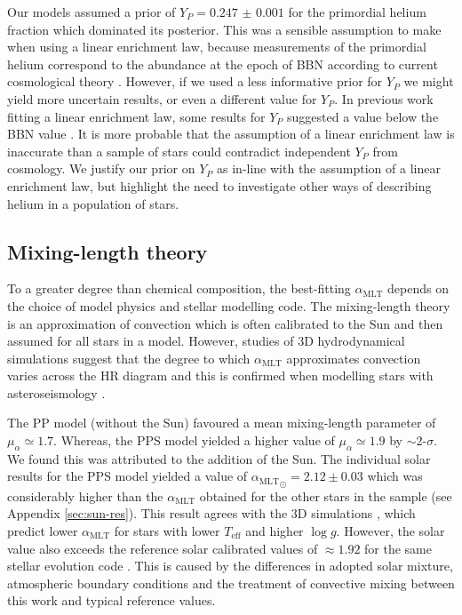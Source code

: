 \documentclass[a4paper,fleqn,usenatbib]{mnras}
\newcommand{\teff}{\ensuremath{T_\mathrm{eff}}}
\newcommand{\mlt}{\ensuremath{{\alpha_\mathrm{MLT}}}}
\begin{document}
Our models assumed a prior of $Y_P = \num{0.247(1)}$ for the primordial helium fraction which dominated its posterior. This was a sensible assumption to make when using a linear enrichment law, because measurements of the primordial helium correspond to the abundance at the epoch of BBN according to current cosmological theory \citep{Cyburt.Fields.ea2016}. However, if we used a less informative prior for $Y_P$ we might yield more uncertain results, or even a different value for $Y_P$. In previous work fitting a linear enrichment law, some results for $Y_P$ suggested a value below the BBN value \citep{Casagrande.Flynn.ea2007, SilvaAguirre.Lund.ea2017}. It is more probable that the assumption of a linear enrichment law is inaccurate than a sample of stars could contradict independent $Y_P$ from cosmology. We justify our prior on $Y_P$ as in-line with the assumption of a linear enrichment law, but highlight the need to investigate other ways of describing helium in a population of stars.

\subsection{Mixing-length theory}\label{sec:mlt}

To a greater degree than chemical composition, the best-fitting $\mlt$ depends on the choice of model physics and stellar modelling code. The mixing-length theory is an approximation of convection which is often calibrated to the Sun and then assumed for all stars in a model. However, studies of 3D hydrodynamical simulations suggest that the degree to which $\mlt$ approximates convection varies across the HR diagram \citep{Magic.Weiss.ea2015} and this is confirmed when modelling stars with asteroseismology \citep{Tayar.Somers.ea2017}.


The PP model (without the Sun) favoured a mean mixing-length parameter of $\mu_\alpha \simeq 1.7$. Whereas, the PPS model yielded a higher value of $\mu_\alpha \simeq 1.9$ by $\sim 2$-$\sigma$. We found this was attributed to the addition of the Sun. The individual solar results for the PPS model yielded a value of $\mlt_\odot = 2.12\pm0.03$ which was considerably higher than the $\mlt$ obtained for the other stars in the sample (see Appendix \ref{sec:sun-res}). This result agrees with the 3D simulations \citep[e.g.][]{Trampedach.Stein.ea2014}, which predict lower $\mlt$ for stars with lower $\teff$ and higher $\log g$. However, the solar value also exceeds the reference solar calibrated values of $\approx 1.92$ for the same stellar evolution code \citep{Paxton.Bildsten.ea2011}. This is caused by the differences in adopted solar mixture, atmospheric boundary conditions and the treatment of convective mixing between this work and typical reference values.
\end{document}
